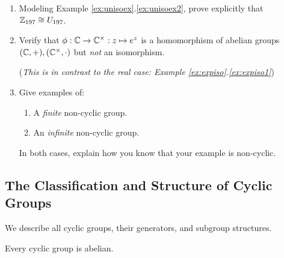 \begin{exercises}
\begin{enumerate}
	
	
		
		\item Modeling Example \ref*{ex:unisoex}.\ref{ex:unisoex2}, prove explicitly that $\mathbb{Z}_{197}\cong U_{197}$.
		
	  
	  \item Verify that $\phi:\mathbb{C}\to\mathbb{C}^\times:z\mapsto e^z$ is a homomorphism of abelian groups $(\mathbb{C},+),(\mathbb{C}^\times,\cdot)$ but \emph{not} an isomorphism.\par
	  (\emph{This is in contrast to the real case: Example \ref*{ex:expiso}.\ref{ex:expiso1}})
		
		
		\item Give examples of:
		\begin{enumerate}
		  \item A \emph{finite} non-cyclic group.
		  \item An \emph{infinite} non-cyclic group.
		\end{enumerate}
		In both cases, explain how you know that your example is non-cyclic.
	 
	\end{enumerate}
\end{exercises}

\clearpage




\subsection{The Classification and Structure of Cyclic Groups}\label{sec:cyclicclass}

We describe all cyclic groups, their generators, and subgroup structures.

\begin{lemm}{}{}
	Every cyclic group is abelian.
\end{lemm}

